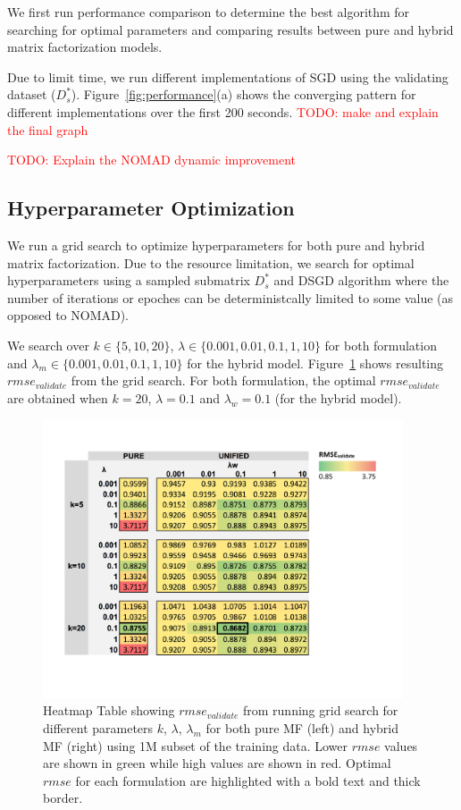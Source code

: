 \documentclass{article} %
\newcommand{\todo}[1]{\textcolor{red}{TODO: #1}}
\begin{document}
We first run performance comparison to determine the best algorithm for
searching for optimal parameters and comparing results  between pure and
hybrid matrix factorization models.

Due to limit time, we run different implementations of SGD using the
validating dataset ($D_s^*$).  Figure~\ref{fig:performance}(a) shows the
converging pattern for different implementations over the first 200 seconds.
\todo{make and explain the final graph}

\todo{Explain the NOMAD dynamic improvement }

\subsection{Hyperparameter Optimization}

We run a grid search to optimize hyperparameters for both pure and hybrid
matrix factorization.
Due to the resource limitation, we search for optimal hyperparameters using a sampled submatrix
$D_s^*$ and DSGD algorithm where the number of iterations or epoches can be deterministcally limited to some value (as opposed to NOMAD). 

We search over $k \in \{5, 10, 20\}$, $\lambda \in \{
0.001, 0.01, 0.1, 1, 10\}$ for both formulation and $\lambda_m \in \{
0.001, 0.01, 0.1, 1, 10\}$ for the hybrid model.  Figure~\ref{fig:gridsearch} shows resulting $rmse_{validate}$ from the grid search.  For both formulation, the optimal $rmse_{validate}$ are obtained when
$k=20$, $\lambda=0.1$ and $\lambda_w=0.1$ (for the hybrid model).

\begin{figure}[h]
\centering
\includegraphics[width=4.2in]{figures/grid}
\caption{\label{fig:gridsearch} Heatmap Table showing $rmse_{validate}$ from
running grid search for different parameters $k$, $\lambda$, $\lambda_m$ for
both pure MF (left) and hybrid MF (right) using 1M subset of the training data.  Lower $rmse$
values are shown in green while high values are shown in red.  Optimal $rmse$
for each formulation are highlighted with a bold text and thick border.}
\end{figure}
\end{document}
